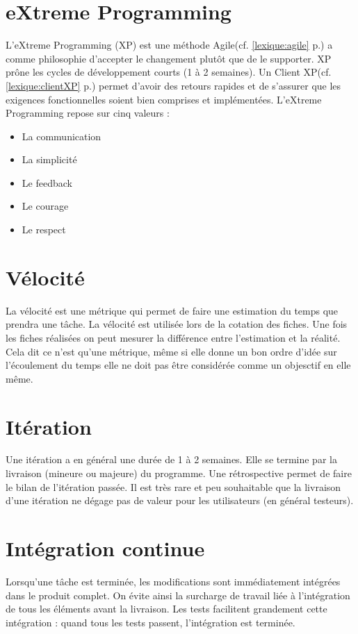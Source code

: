 \section{eXtreme Programming}\label{lexique:XP}
L'eXtreme Programming (XP) est une méthode Agile(cf. \ref{lexique:agile} p.\pageref{lexique:agile}) a comme philosophie d'accepter le changement plutôt que de le supporter. XP prône les cycles de développement courts (1 à 2 semaines). Un Client XP(cf. \ref{lexique:clientXP} p.\pageref{lexique:clientXP}) permet d'avoir des retours rapides et de s'assurer que les exigences fonctionnelles soient bien comprises et implémentées. L'eXtreme Programming repose sur cinq valeurs :
\begin{itemize}
\item{La communication}
\item{La simplicité}
\item{Le feedback}
\item{Le courage}
\item{Le respect}
\end{itemize}

\section{Vélocité}\label{lexique:velocité}
La vélocité est une métrique qui permet de faire une estimation du temps que prendra une tâche. La vélocité est utilisée lors de la cotation des fiches. Une fois les fiches réalisées on peut mesurer la différence entre l'estimation et la réalité. Cela dit ce n'est qu'une métrique, même si elle donne un bon ordre d'idée sur l'écoulement du temps elle ne doit pas être considérée comme un objesctif en elle même.

\section{Itération}
Une itération a en général une durée de 1 à 2 semaines. Elle se termine par la livraison (mineure ou majeure) du programme. Une rétrospective permet de faire le bilan de l'itération passée. Il est très rare et peu souhaitable que la livraison d'une itération ne dégage pas de valeur pour les utilisateurs (en général testeurs).

\section{Intégration continue}\label{lexique:integrationContinue}
Lorsqu'une tâche est terminée, les modifications sont immédiatement intégrées dans le produit complet. On évite ainsi la surcharge de travail liée à l'intégration de tous les éléments avant la livraison. Les tests facilitent grandement cette intégration : quand tous les tests passent, l'intégration est terminée. 

